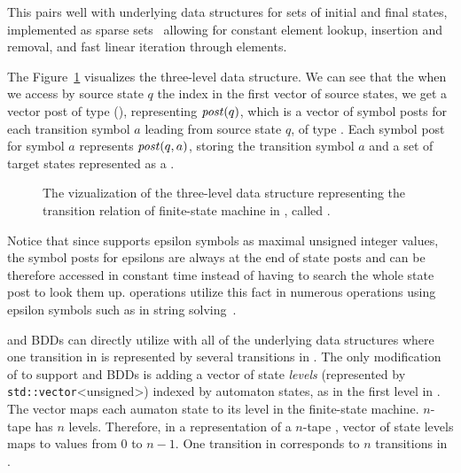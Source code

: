 This pairs well with underlying data structures for sets of initial and final states, implemented as sparse sets~\cite{sparseset93} allowing for constant element lookup, insertion and removal, and fast linear iteration through elements.

The Figure~\ref{fig:delta_struct} visualizes the three-level \deltastruct data structure. We can see that the when we access by source state $q$ the index in the first vector of source states, we get a vector post of type \statepost (\statepost[q]), representing $\mathit{post}(q)$, which is a vector of symbol posts for each transition symbol $a$ leading from source state $q$, of type \symbolpost.
Each symbol post for symbol $a$ represents $\mathit{post}(q, a)$, storing the transition symbol $a$ and a set of target states represented as a \ordvector.

\begin{figure}[ht]
\begin{center}

\end{center}
\caption{
The vizualization of the three-level data structure representing the transition relation of finite-state machine in \mata, called \deltastruct.
}
\label{fig:delta_struct}
\end{figure}

Notice that since \mata supports epsilon symbols as maximal unsigned integer values, the symbol posts for epsilons are always at the end of state posts and can be therefore accessed in constant time instead of having to search the whole state post to look them up. \mata operations utilize this fact in numerous operations using epsilon symbols such as in string solving~\cite{fm23_equations_synergy_regular_constraints_DBLP:conf/fm/BlahoudekCCHHLS23}.

\nfts and BDDs can directly utilize \nfaClass with all of the underlying data structures where one transition in \nft is represented by several transitions in \nfaClass.
The only modification of \nfaClass to support \nfts and BDDs is adding a vector of state \emph{levels} (represented by \texttt{std::vector}<unsigned>) indexed by automaton states, as in the first level in \deltastruct. The vector maps each aumaton state to its level in the finite-state machine.
$n$-tape \nft has $n$ levels.
Therefore, in a representation of a $n$-tape \nft, vector of state levels maps to values from $0$ to $n-1$.
One transition in \nft corresponds to $n$ transitions in \nfaClass.

